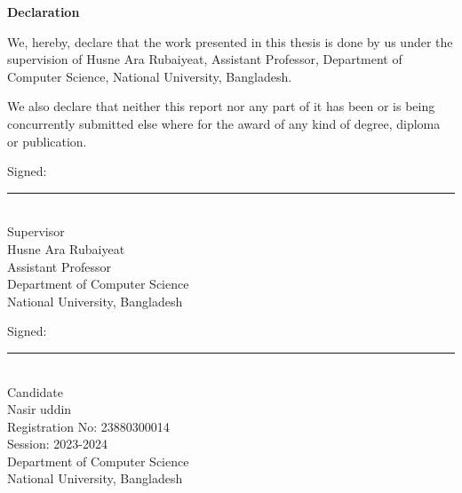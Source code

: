 \begin{singlespace}
{\noindent\LARGE\bfseries Declaration\par}
\vspace{1.5em}

\noindent We, hereby, declare that the work presented in this thesis is done by us under the supervision of Husne Ara Rubaiyeat, Assistant Professor, Department of Computer Science, National University, Bangladesh.\par

\vspace{1.0em}

\noindent We also declare that neither this report nor any part of it has been or is being concurrently submitted else where for the award of any kind of degree, diploma or publication.\par

\vspace{2.5em}

\noindent Signed:\par
\vspace{2.2em}
\noindent \rule{5.5cm}{0.5pt}\\
Supervisor\\
Husne Ara Rubaiyeat\\
Assistant Professor\\
Department of Computer Science\\
National University, Bangladesh

\vspace{2.5em}

\noindent Signed:\par
\vspace{2.2em}
\noindent \rule{5.5cm}{0.5pt}\\
Candidate\\
Nasir uddin\\
Registration No: 23880300014\\
Session: 2023-2024\\
Department of Computer Science\\
National University, Bangladesh
\end{singlespace}
\clearpage
